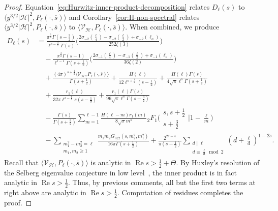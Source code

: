 \documentclass[11pt,reqno]{amsart}
\theoremstyle{plain}
\theoremstyle{definition}
\numberwithin{equation}{section}
\renewcommand{\Re}{\operatorname{Re}}
\begin{document}
\begin{proof}
Equation~\eqref{eq:Hurwitz-inner-product-decomposition} relates $D_\ell(s)$ to $\langle y^{3/2} \vert \mathcal{H} \vert^2, P_\ell(\cdot, \overline{s}) \rangle$ and Corollary~\ref{cor:H-non-spectral} relates $\langle y^{3/2} \vert \mathcal{H} \vert^2, P_\ell(\cdot, \overline{s}) \rangle$ to $\langle \mathcal{V}_\mathcal{H}, P_\ell(\cdot, \overline{s}) \rangle$. When combined, we produce
\begin{align} \label{eq:D_h-decomposition-full}
	D_\ell(s) &=
		\frac{\pi^{\frac{5}{2}} \Gamma(s-\frac{3}{2})}
					{\ell^{s-\frac{3}{2}} \Gamma(s)}
				\Big(\frac{2\sigma_{-2}(\frac{\ell}{4}) - \sigma_{-2}(\frac{\ell}{2})+\sigma_{-2}(\ell_o)}
									{252\zeta(3)} \Big) \\
		& \quad
		 - \frac{\pi^{\frac{3}{2}} \Gamma(s-1)}{\ell^{s-1} \Gamma(s+\frac{1}{2})}
				\Big(\frac{2\sigma_{-1}(\frac{\ell}{4}) - \sigma_{-1}(\frac{\ell}{2})+\sigma_{-1}(\ell_o)}
				{36\zeta(2)} \Big) \\
		& \quad
		+	\frac{(4\pi)^{s+\frac{1}{2}}
				\langle \mathcal{V}_\mathcal{H}, P_\ell(\cdot, \overline{s}) \rangle}
				{\Gamma(s+\frac{1}{2})}
			+ \frac{ H(\ell)}{12 \ell^{s+\frac{1}{2}} (s-\frac{1}{2})} 
	   + \frac{H(\ell)\Gamma(s)}{4 \sqrt{\pi} \ell^s \Gamma(s+\frac{1}{2})} \\
	& \quad
	+ \frac{r_1(\ell) }{32 \pi \ell^{s-\frac{1}{2}} s (s-\frac{1}{2})}
		+ \frac{r_1(\ell) \Gamma(s)}{96 \sqrt{\pi} \ell^s \Gamma(s+\frac{3}{2})} \\
	& \quad
		- \frac{\Gamma(s)}{\Gamma(s+\frac{3}{2})} 
		\sum_{m=1}^{\ell-1} \frac{H(\ell-m)  r_1(m)}{8 \sqrt{\pi} m^s} 
		{}_2F_1\Big(\begin{matrix} s, s+\frac{1}{2} \\ s+\frac{3}{2} \end{matrix}
					\Big\vert 1-\frac{\ell}{m} \Big) \\
	& \quad 
	- \sum_{\substack{m_1^2 - m_2^2 =\ell \\ m_1,m_2 \geq 1}}
		\frac{m_1 m_2  G_{3/2}(s,m_2^2, m_1^2) }{16\pi \Gamma(s+\frac{1}{2})}
	+ \frac{2^{2s-4}}{\pi (s-\frac{1}{2})}
		 \!\!\!\! \sum_{\substack{d \mid \ell \\ d \equiv \frac{\ell}{d} \bmod 2}} \!\!\!
			(d+\tfrac{\ell}{d})^{1-2s}.
\end{align}
Recall that $\langle \mathcal{V}_\mathcal{H}, P_\ell(\cdot, \overline{s}) \rangle$ is analytic in $\Re s > \frac{1}{2} + \Theta$. By Huxley's resolution of the Selberg eigenvalue conjecture in low level~\cite{Huxley85}, the inner product is in fact analytic in $\Re s > \frac{1}{2}$. Thus, by previous comments, all but the first two terms at right above are analytic in $\Re s > \frac{1}{2}$. Computation of residues completes the proof.
\end{proof}
\end{document}
